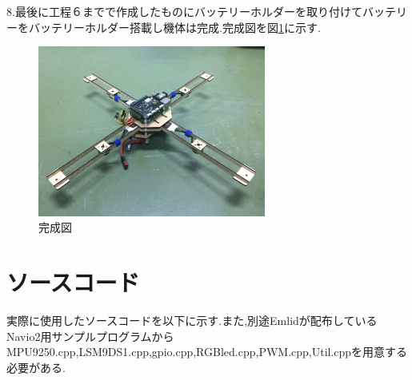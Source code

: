 \documentclass[12pt,oneside]{sotsuken_paper}
\begin{document}
\newpage

8.最後に工程６までで作成したものにバッテリーホルダーを取り付けてバッテリーをバッテリーホルダー搭載し機体は完成.完成図を図\ref{fig:kitai}に示す.

\begin{figure}[htbp]
	\begin{center}
		\includegraphics[width=75mm]{image/kitai/kitai.jpg}
		\caption{完成図}
		\label{fig:kitai}
	\end{center}
\end{figure}

\clearpage

\section{ソースコード}
実際に使用したソースコードを以下に示す.また,別途Emlidが配布しているNavio2用サンプルプログラムからMPU9250.cpp,LSM9DS1.cpp,gpio.cpp,RGBled.cpp,PWM.cpp,Util.cppを用意する必要がある.


\end{document}
